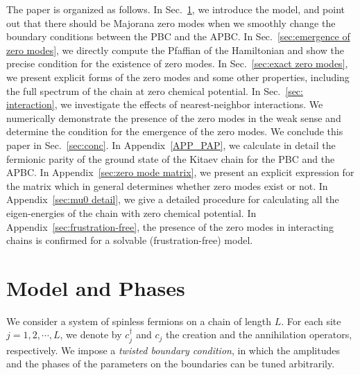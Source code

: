 \documentclass[aps, prb, showpacs, twocolumn, %
amssymb,superscriptaddress]{revtex4}
\begin{document}
The paper is organized as follows. In Sec.~\ref{sec:model}, we introduce the model, and point out that there should be Majorana zero modes when we smoothly change the boundary conditions between the PBC and the APBC. 
In Sec.~\ref{sec:emergence of zero modes}, we directly compute the Pfaffian of the Hamiltonian and show the precise condition for the existence of zero modes. 
In Sec.~\ref{sec:exact zero modes}, we present explicit forms of the zero modes and some other properties, including the full spectrum of the chain at zero chemical potential. 
In Sec.~\ref{sec: interaction}, we investigate the effects of nearest-neighbor %
interactions. We numerically demonstrate the presence of the zero modes in the weak sense %
and determine the condition for the emergence of the zero modes. 
We conclude this paper in Sec.~\ref{sec:conc}. In Appendix~\ref{APP_PAP}, we calculate in detail the fermionic parity of the ground state of the Kitaev chain for the PBC and the APBC. In Appendix~\ref{sec:zero mode matrix}, we present an explicit expression for the matrix which in general determines whether zero modes exist or not. In Appendix~\ref{sec:mu0 detail}, we give a detailed procedure for calculating all the eigen-energies of the chain with zero chemical potential. In Appendix~\ref{sec:frustration-free}, the presence of the zero modes in interacting chains is confirmed for a solvable (frustration-free) model\cite{Katsura_Int_Majorana}.


\section{Model and Phases}
\label{sec:model}

We consider a system of spinless fermions on a chain of length $L$. For each site $j=1,2, \cdots, L$, we denote by $c^{\dagger}_{j}$ and $c_{j}$ the creation and the annihilation operators, respectively. We impose a \textit{twisted boundary condition}, in which the amplitudes and the phases of the parameters on the boundaries can be tuned arbitrarily.
\end{document}
